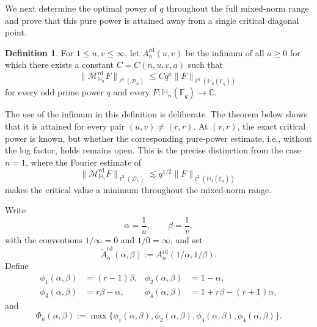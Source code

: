 \documentclass[11pt,letterpaper]{amsart}
\numberwithin{equation}{section}
\theoremstyle{definition}
\newtheorem{definition}[definition]{Definition}
\theoremstyle{remark}
\newcommand{\Fq}{\mathbb F_q}
\newcommand{\C}{\mathbb C}
\newcommand{\HH}{\mathbb H}
\newcommand{\Dn}{\mathcal D_n}
\newcommand{\Mrd}{\mathcal M^{\mathrm{rd}}_{\HH_n}}
\newcommand{\norm}[1]{\lVert #1\rVert}
\begin{document}
We next determine the optimal power of $q$ throughout the full
mixed-norm range and prove that this pure power is attained
away from a single critical diagonal point.

\begin{definition}\label{def:critical-exponent}
For $1\leq u,v\leq\infty$, let $A_n^{\mathrm{rd}}(u,v)$ be the infimum
of all $a\geq0$ for which there exists a constant
$C=C(n,u,v,a)$ such that
\begin{equation}\label{eq:def-critical-exponent}
 \norm{\Mrd F}_{\ell^v(\Dn)}
 \leq
 Cq^a
 \norm{F}_{\ell^u(\HH_n(\Fq))}
\end{equation}
for every odd prime power $q$ and every
$F:\HH_n(\Fq)\to\C$.
\end{definition}


The use of the infimum in this definition is deliberate. The theorem below shows that it is attained for every pair $(u,v)\neq(r,r)$.  At $(r,r)$, the exact critical power is known, but whether the corresponding pure-power estimate, i.e., without the log factor, holds remains open.  This is the precise distinction from the case $n=1$, where the Fourier estimate of
\begin{equation}\label{eq:intro-n1-estimate}
 \norm{\mathcal M^{\mathrm{rd}}_{\HH_1}F}_{\ell^2(\mathcal D_1)}
 \lesssim
 q^{1/2}\norm{F}_{\ell^2(\HH_1(\Fq))}
\end{equation} makes the critical value a minimum throughout the mixed-norm range.


Write
\[
 \alpha=\frac1u,
 \qquad
 \beta=\frac1v,
\]
with the conventions $1/\infty=0$ and $1/0=\infty$, and set
\[
 \widetilde A_n^{\mathrm{rd}}(\alpha,\beta)
 :=
 A_n^{\mathrm{rd}}(1/\alpha,1/\beta).
\]
Define
\begin{equation}\label{eq:four-functionals}
 \begin{aligned}
 \phi_1(\alpha,\beta)&=(r-1)\beta,
 &
 \phi_2(\alpha,\beta)&=1-\alpha,\\
 \phi_3(\alpha,\beta)&=r\beta-\alpha,
 &
 \phi_4(\alpha,\beta)&=1+r\beta-(r+1)\alpha,
 \end{aligned}
\end{equation}
and
\begin{equation}\label{eq:Phi}
 \Phi_n(\alpha,\beta)
 :=
 \max\{
   \phi_1(\alpha,\beta),
   \phi_2(\alpha,\beta),
   \phi_3(\alpha,\beta),
   \phi_4(\alpha,\beta)
 \}.
\end{equation}
\end{document}
